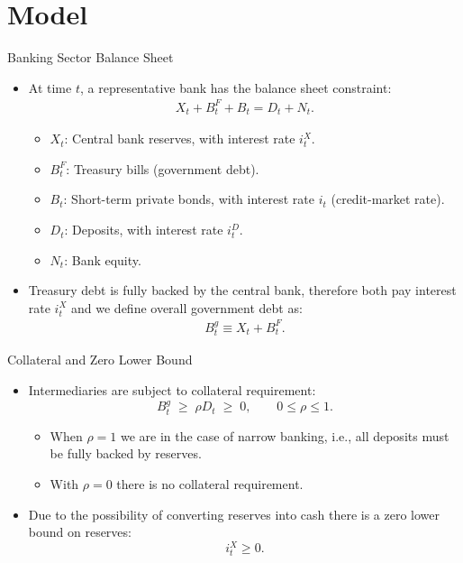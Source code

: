 \documentclass[11pt,aspectratio=169]{beamer}
\begin{document}
\section{Model}

\begin{frame}{Banking Sector Balance Sheet}
  \begin{itemize}
    \item At time $t$, a representative bank has the balance sheet constraint:
\begin{align}
X_t + B_t^F + B_t = D_t + N_t.\label{8.1}
\end{align}
    \begin{itemize}
      \item $X_t$: Central bank reserves, with interest rate $i_t^X$.
      \item $B_t^F$: Treasury bills (government debt).
      \item $B_t$: Short-term private bonds, with interest rate $i_t$ (credit-market rate).
      \item $D_t$: Deposits, with interest rate $i_t^D$.
      \item $N_t$: Bank equity.
    \end{itemize}
    \medskip
    \item Treasury debt is fully backed by the central bank, therefore both pay interest rate $i_t^X$ and we define overall government debt as:
\begin{align*}
      B_t^g \equiv X_t + B_t^F.
\end{align*}
\end{itemize}
\end{frame}

    


\begin{frame}{Collateral and Zero Lower Bound}
  \begin{itemize}
    \item Intermediaries are subject to collateral requirement: 
$$ B_t^g \;\ge\; \rho D_t \;\ge\; 0,
      \qquad 0 \le \rho \le 1. $$
    \begin{itemize}
      \item When $\rho = 1$ we are in the case of narrow banking, i.e., all deposits must be fully backed by reserves.
      \item With $\rho = 0$ there is no collateral requirement.
    \end{itemize}
    \medskip
    \item Due to the possibility of converting reserves into cash there is a zero lower bound on reserves:
$$i_t^X \ge 0.$$
  \end{itemize}
\end{frame}
\end{document}
